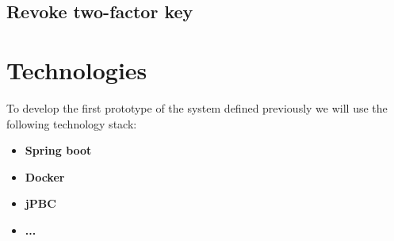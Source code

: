 

\subsection{Revoke two-factor key}



\section{Technologies}
To develop the first prototype of the system defined previously we will use the following technology stack:

\begin{itemize}
  \item \textbf{Spring boot}
  \item \textbf{Docker}
  \item \textbf{jPBC} \cite{ISCC:DecIov11}
  \item \textbf{...}
\end{itemize}

